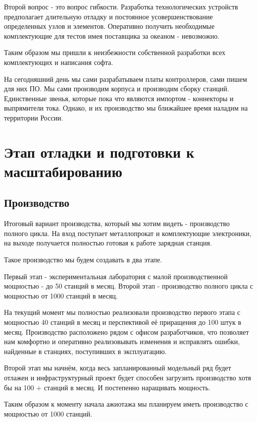 \documentclass[a4paper,12pt]{report}
\begin{document}
Второй вопрос - это вопрос гибкости. Разработка технологических устройств предполагает длительную отладку и постоянное усовершенствование определенных узлов и элементов. Оперативно получить необходимые комплектующие для тестов имея поставщика за океаном - невозможно.

Таким образом мы пришли к неизбежности собственной разработки всех комплектующих и написания софта. 

На сегодняшний день мы сами разрабатываем платы контроллеров, сами пишем для них ПО. Мы сами производим корпуса и производим сборку станций. Единственные звенья, которые пока что являются импортом - коннекторы и выпрямители тока. Однако, и их производство мы ближайшее время наладим на территории России. 

\section{Этап отладки и подготовки к масштабированию}

\subsection{Производство} 

Итоговый вариант производства, который мы хотим видеть - производство полного цикла. На вход поступает металлопрокат и комплектующие электроники, на выходе получается полностью готовая к работе зарядная станция. 

Такое производство мы будем создавать в два этапе. 

Первый этап - экспериментальная лаборатория с малой производственной мощностью - до 50 станций в месяц. 
Второй этап - производство полного цикла с мощностью от 1000 станций в месяц. 

На текущий момент мы полностью реализовали производство первого этапа с мощностью 40 станций в месяц и перспективой её приращения до 100 штук в месяц. Производство расположено рядом с офисом разработчиков, что позволяет нам комфортно и оперативно реализовывать изменения и исправлять ошибки, найденные в станциях, поступивших в эксплуатацию.

Второй этап мы начнём, когда весь запланированный модельный ряд будет отлажен и инфраструктурный проект будет способен загрузить производство хотя бы на 100 + станций в месяц. И постепенно наращивать мощность.

Таким образом к моменту начала ажиотажа мы планируем иметь производство с мощностью от 1000 станций.
\end{document}
